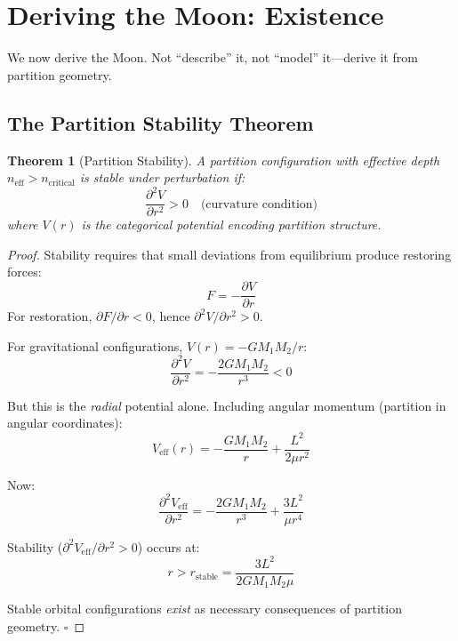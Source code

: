 \documentclass[twocolumn,10pt]{article}
\newtheorem{theorem}{Theorem}[section]
\theoremstyle{definition}
\theoremstyle{remark}
\begin{document}
\section{Deriving the Moon: Existence}
\label{sec:existence}

We now derive the Moon. Not ``describe'' it, not ``model'' it---derive it from partition geometry.

\subsection{The Partition Stability Theorem}

\begin{theorem}[Partition Stability]
\label{thm:stability}
A partition configuration with effective depth $n_{\text{eff}} > n_{\text{critical}}$ is stable under perturbation if:
\begin{equation}
\frac{\partial^2 V}{\partial r^2} > 0 \quad \text{(curvature condition)}
\end{equation}
where $V(r)$ is the categorical potential encoding partition structure.
\end{theorem}

\begin{proof}
Stability requires that small deviations from equilibrium produce restoring forces:
\begin{equation}
F = -\frac{\partial V}{\partial r}
\end{equation}
For restoration, $\partial F/\partial r < 0$, hence $\partial^2 V/\partial r^2 > 0$.

For gravitational configurations, $V(r) = -GM_1 M_2/r$:
\begin{equation}
\frac{\partial^2 V}{\partial r^2} = -\frac{2GM_1 M_2}{r^3} < 0
\end{equation}

But this is the \emph{radial} potential alone. Including angular momentum (partition in angular coordinates):
\begin{equation}
V_{\text{eff}}(r) = -\frac{GM_1 M_2}{r} + \frac{L^2}{2\mu r^2}
\end{equation}

Now:
\begin{equation}
\frac{\partial^2 V_{\text{eff}}}{\partial r^2} = -\frac{2GM_1 M_2}{r^3} + \frac{3L^2}{\mu r^4}
\end{equation}

Stability ($\partial^2 V_{\text{eff}}/\partial r^2 > 0$) occurs at:
\begin{equation}
r > r_{\text{stable}} = \frac{3L^2}{2GM_1 M_2 \mu}
\end{equation}

Stable orbital configurations \emph{exist} as necessary consequences of partition geometry. $\square$
\end{proof}
\end{document}
